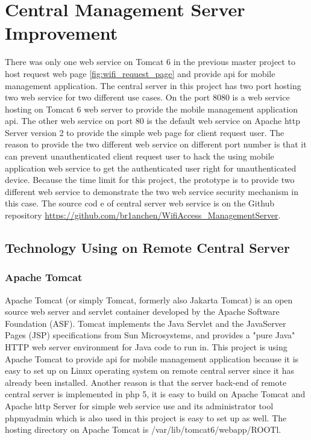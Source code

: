 \chapter{Central Management Server Improvement}
\label{chp:central_server}

\par There was only one web service on Tomcat 6 in the previous master project to host request web page \ref{fig:wifi_request_page} and provide \gls{api} for mobile management application. The central server in this project has two port hosting two web service for two different use cases.  On the port 8080 is a web service hosting on Tomcat 6 \cite{tomcat} web server to provide the mobile management application \gls{api}. The other web service on port 80 is the default web service on Apache \gls{http} Server \cite{apache} version 2 to provide the simple web page for client request user. The reason to provide the two different web service on different port number is that it can prevent unauthenticated client request user to hack the using mobile application web service to get the authenticated user right for unauthenticated device. Because the time limit for this project, the prototype is to provide two different web service to demonstrate the two web service security mechanism in this case. The source cod e of central server web service is on the Github repository \url{https://github.com/br1anchen/WifiAccess_ManagementServer}.

\section{Technology Using on Remote Central Server}

\subsection{Apache Tomcat}
\par Apache Tomcat (or simply Tomcat, formerly also Jakarta Tomcat) is an open source web server and servlet container developed by the Apache Software Foundation (ASF). Tomcat implements the Java Servlet and the JavaServer Pages (JSP) specifications from Sun Microsystems, and provides a "pure Java" HTTP web server environment for Java code to run in. This project is using Apache Tomcat to provide \gls{api} for mobile management application because it is easy to set up on Linux operating system on remote central server since it has already been installed. Another reason is that the server back-end of remote central server is implemented in \gls{php} 5, it is easy to build on Apache Tomcat and Apache \gls{http} Server for simple web service use and its administrator tool phpmyadmin \cite{phpmyadmin} which is also used in this project is easy to set up as well. The hosting directory on Apache Tomcat is /var/lib/tomcat6/webapp/ROOTl.

